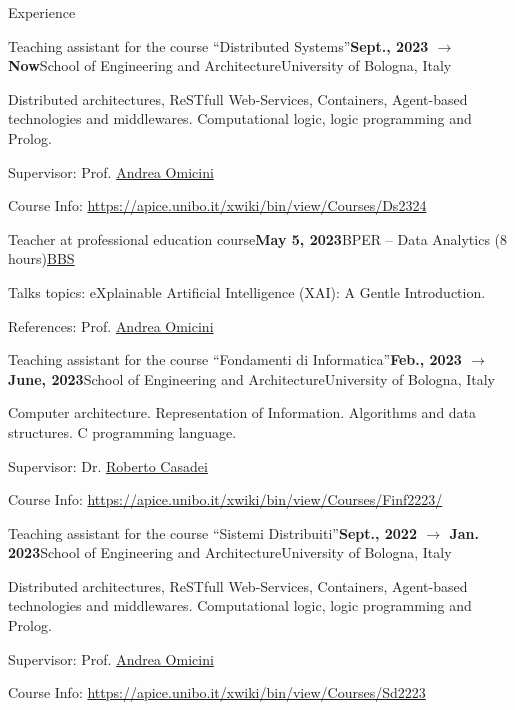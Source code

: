 \documentclass{resume} %
\begin{document}
    \begin{rSection}{Experience}
        
        \begin{rSubsection}{Teaching assistant for the course ``Distributed Systems''}{\textbf{Sept., 2023 $\rightarrow$ Now}}{School of Engineering and Architecture}{University of Bologna, Italy}
            \item Distributed architectures, ReSTfull Web-Services, Containers, Agent-based technologies and middlewares. Computational logic, logic programming and Prolog.
            \item Supervisor: Prof. \href{mailto:andrea.omicini@unibo.it}{Andrea Omicini}
            \item Course Info: \url{https://apice.unibo.it/xwiki/bin/view/Courses/Ds2324}
        \end{rSubsection}
        
        \begin{rSubsection}{Teacher at professional education course}{\textbf{May 5, 2023}}{BPER -- Data Analytics (8 hours)}{\href{https://www.bbs.unibo.eu/}{BBS}}
            \item Talks topics: eXplainable Artificial Intelligence (XAI): A Gentle Introduction.
            \item References:  Prof. \href{mailto:andrea.omicini@unibo.it}{Andrea Omicini}
        \end{rSubsection}
        
        \begin{rSubsection}{Teaching assistant for the course ``Fondamenti di Informatica''}{\textbf{Feb., 2023 $\rightarrow$ June, 2023}}{School of Engineering and Architecture}{University of Bologna, Italy}
            \item Computer architecture. Representation of Information. Algorithms and data structures. C programming language.
            \item Supervisor: Dr. \href{mailto:roberto.casadei@unibo.it}{Roberto Casadei}
            \item Course Info: \url{https://apice.unibo.it/xwiki/bin/view/Courses/Finf2223/}
        \end{rSubsection}
        
        \begin{rSubsection}{Teaching assistant for the course ``Sistemi Distribuiti''}{\textbf{Sept., 2022 $\rightarrow$ Jan. 2023}}{School of Engineering and Architecture}{University of Bologna, Italy}
            \item Distributed architectures, ReSTfull Web-Services, Containers, Agent-based technologies and middlewares. Computational logic, logic programming and Prolog.
            \item Supervisor: Prof. \href{mailto:andrea.omicini@unibo.it}{Andrea Omicini}
            \item Course Info: \url{https://apice.unibo.it/xwiki/bin/view/Courses/Sd2223}
        \end{rSubsection}
        

\end{rSection}
\end{document}
